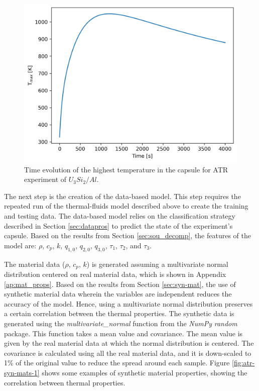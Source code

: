 \begin{figure}[htbp!] %
    \centering
    \includegraphics[width=0.45\linewidth]{figures/atr-U3Si2Al}
    \hfill
    \caption{Time evolution of the highest temperature in the capsule for ATR experiment of $U_3Si_2/Al$.}
    \label{fig:atr-u3si2al}
\end{figure}

The next step is the creation of the data-based model.
This step requires the repeated run of the thermal-fluids model described above to create the training and testing data.
The data-based model relies on the classification strategy described in Section \ref{sec:datapros} to predict the state of the experiment's capsule.
Based on the results from Section \ref{sec:sou_decomp}, the features of the model are: $\rho$, $c_p$, $k$, $q_{1,0}$, $q_{2,0}$, $q_{3,0}$, $\tau_1$, $\tau_2$, and $\tau_3$.

The material data ($\rho$, $c_p$, $k$) is generated assuming a multivariate normal distribution centered on real material data, which is shown in Appendix \ref{ap:mat_props}.
Based on the results from Section \ref{sec:syn-mat}, the use of synthetic material data wherein the variables are independent reduces the accuracy of the model.
Hence, using a multivariate normal distribution preserves a certain correlation between the thermal properties.
The synthetic data is generated using the \textit{multivariate\_normal} function from the \textit{NumPy} \textit{random} package.
This function takes a mean value and covariance.
The mean value is given by the real material data at which the normal distribution is centered.
The covariance is calculated using all the real material data, and it is down-scaled to 1\% of the original value to reduce the spread around each sample.
Figure \ref{fig:atr-syn-mats-1} shows some examples of synthetic material properties, showing the correlation between thermal properties.

